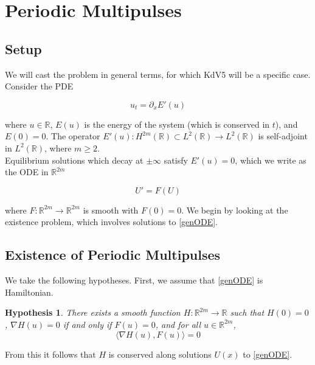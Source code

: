 \documentclass[12pt]{article}
\def\R{{\mathbb R}}
\newtheorem{hypothesis}{Hypothesis}
\begin{document}
\section{Periodic Multipulses}

\subsection{Setup}

We will cast the problem in general terms, for which KdV5 will be a specific case. Consider the PDE

\begin{equation}\label{genPDE}
u_t = \partial_x E'(u)
\end{equation}

where $u \in \R$, $E(u)$ is the energy of the system (which is conserved in $t$), and $E(0) = 0$. The operator $E'(u): H^{2m}(\R) \subset L^2(\R) \rightarrow L^2(\R)$ is self-adjoint in $L^2(\R)$, where $m \geq 2$.\\

Equilibrium solutions which decay at $\pm \infty$ satisfy $E'(u) = 0$, which we write as the ODE in $\R^{2m}$

\begin{equation}\label{genODE}
U' = F(U)
\end{equation}

where $F: \R^{2m} \rightarrow \R^{2m}$ is smooth with $F(0) = 0$. We begin by looking at the existence problem, which involves solutions to \eqref{genODE}.

\subsection{Existence of Periodic Multipulses}

We take the following hypotheses. First, we assume that \eqref{genODE} is Hamiltonian.

\begin{hypothesis}\label{Hhyp}
There exists a smooth function $H: \R^{2m} \rightarrow \R$ such that $H(0) = 0$, $\nabla H(u) = 0$ if and only if $F(u) = 0$, and for all $u \in \R^{2m}$,
\begin{equation}
\langle \nabla H(u), F(u) \rangle = 0
\end{equation}
\end{hypothesis}

From this it follows that $H$ is conserved along solutions $U(x)$ to \eqref{genODE}.\\
\end{document}
